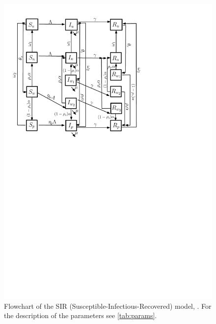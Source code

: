 \documentclass{article}
\theoremstyle{definition} %
\begin{document}
\begin{figure}[!h] 
\begin{center} 
\includegraphics[scale=1]{../pix/flowchart2}
\caption{\small Flowchart of the SIR (Susceptible-Infectious-Recovered) model, . For the description of the parameters see \cref{tab:params}.
\label{fig:flowchart}}
\end{center} 
\end{figure}








\end{document}
